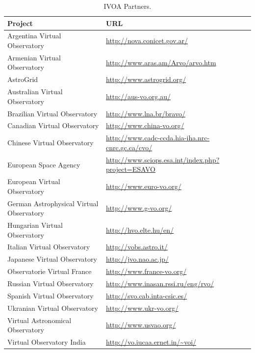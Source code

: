 \begin{table}%
\centering
\begin{tabular}{|p{7cm}|p{7cm}|}
	\hline
	\textbf{Project} & \textbf{URL} \\
	\hline
	Argentina Virtual Observatory & \url{http://nova.conicet.gov.ar/} \\
	\hline
	Armenian Virtual Observatory & \url{http://www.aras.am/Arvo/arvo.htm} \\
	\hline
	AstroGrid & \url{http://www.astrogrid.org/} \\
	\hline
	Australian Virtual Observatory & \url{http://aus-vo.org.au/} \\
	\hline
	Brazilian Virtual Observatory & \url{http://www.lna.br/bravo/} \\
	\hline
	Canadian Virtual Observatory & \url{http://www.china-vo.org/} \\
	\hline
    Chinese Virtual Observatory &
    \url{http://www.cadc-ccda.hia-iha.nrc-cnrc.gc.ca/cvo/} \\
	\hline
    European Space Agency &
    \url{http://www.sciops.esa.int/index.php?project=ESAVO} \\
	\hline
	European Virtual Observatory & \url{http://www.euro-vo.org/} \\
	\hline
	German Astrophysical Virtual Observatory & \url{http://www.g-vo.org/} \\
	\hline
	Hungarian Virtual Observatory & \url{http://hvo.elte.hu/en/} \\
	\hline
	Italian Virtual Observatory & \url{http://vobs.astro.it/} \\
	\hline
	Japanese Virtual Observatory & \url{http://jvo.nao.ac.jp/}\\
	\hline
	Observatorie Virtual France & \url{http://www.france-vo.org/} \\
	\hline
	Russian Virtual Observatory & \url{http://www.inasan.rssi.ru/eng/rvo/} \\
	\hline
	Spanish Virtual Observatory & \url{http://svo.cab.inta-csic.es/} \\
	\hline
	Ukranian Virtual Observatory & \url{http://www.ukr-vo.org/} \\
	\hline
	Virtual Astronomical Observatory & \url{http://www.usvao.org/} \\
	\hline
	Virtual Observatory India & \url{http://vo.iucaa.ernet.in/~voi/} \\
	\hline
\end{tabular}
\caption{IVOA Partners.}
\label{table:partners}
\end{table}

